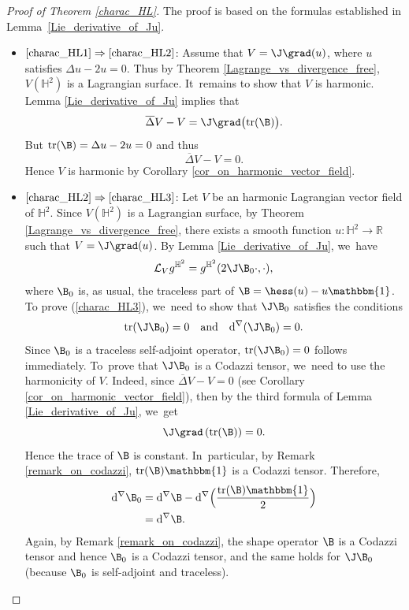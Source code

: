 \pagebreak[2]
\begin{proof}[Proof of Theorem \ref{charac_HL}]
The proof is based on the formulas established in Lem\-ma~\ref{Lie_derivative_of_Ju}.

\begin{itemize}
\item
$\eqref{charac_HL1}\Rightarrow\eqref{charac_HL2}$: Assume that \(V = \J \grad(u) \), where \(u \) satisfies \(\Delta u - 2u = 0\). Thus by Theorem \ref{Lagrange_vs_divergence_free}, \(V(\mathbb{H}^2) \) is a Lagrangian surface. It~remains to show that \(V \) is harmonic. Lemma \ref{Lie_derivative_of_Ju} implies that
\[\overline{\Delta} V - V = \J \grad\bigl(\mathrm{tr}(\B)\bigr).\]
But \(\mathrm{tr}(\B) = \Delta u - 2u = 0\) and thus
\[\overline{\Delta} V - V = 0.\]
Hence \(V \) is harmonic by Corollary \ref{cor_on_harmonic_vector_field}.

\item
$\eqref{charac_HL2}\Rightarrow\eqref{charac_HL3}$: Let $V$ be an harmonic Lagrangian vector field of $\mathbb{H}^2$. Since $V(\mathbb{H}^2)$ is a Lagrangian surface, by Theorem \ref{Lagrange_vs_divergence_free}, there exists a smooth function $u:\mathbb{H}^2 \to \mathbb{R}$ such that $V = \J\grad(u)$. By Lemma \ref{Lie_derivative_of_Ju}, we~have
\[ \mathcal{L}_Vg^{\mathbb{H}^2} = g^{\mathbb{H}^2}(2\J\B_0 \cdot, \cdot), \]
where $\B_0$ is, as usual, the traceless part of $\B = \hess(u) - u\mathbbm{1}$. To prove (\ref{charac_HL3}), we~need to show that $\J\B_0$ satisfies the conditions
\[
\mathrm{tr}(\J\B_0) = 0 \quad \text{and} \quad \mathrm{d}^{\nabla}(\J\B_0) = 0.
\]
Since $\B_0$ is a traceless self-adjoint operator, $\mathrm{tr}(\J\B_0) = 0$ follows immediately. To~prove that $\J\B_0$ is a Codazzi tensor, we~need to use the harmonicity of $V$. Indeed, since $\overline{\Delta}V - V = 0$ (see Corollary \ref{cor_on_harmonic_vector_field}), then by the third formula of Lemma \ref{Lie_derivative_of_Ju}, we~get
\[ \J\grad\left(\mathrm{tr}(\B)\right) = 0. \]
Hence the trace of $\B$ is constant. In~particular, by Remark \ref{remark_on_codazzi}, $\mathrm{tr}(\B)\mathbbm{1}$ is a Codazzi tensor. Therefore,
\begin{align*}
\mathrm{d}^{\nabla}\B_0 &= \mathrm{d}^{\nabla}\B - \mathrm{d}^{\nabla}\Bigl(\frac{\mathrm{tr}(\B)\mathbbm{1}}{2} \Bigr) \\
&= \mathrm{d}^{\nabla}\B.
\end{align*}
Again, by Remark \ref{remark_on_codazzi}, the shape operator $\B$ is a Codazzi tensor and hence $\B_0$ is a Codazzi tensor, and the same holds for $\J\B_0$ (because $\B_0$ is self-adjoint and traceless).


\end{itemize}
\end{proof}
